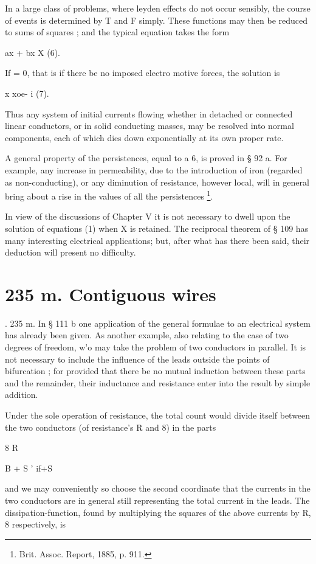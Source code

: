 In a large class of problems, where leyden effects do not occur sensibly, the
course of events is determined by T and F simply.  These functions may then be
reduced to sums of squares ; and the typical equation takes the form

ax + bx X (6).

If = 0, that is if there be no imposed electro motive forces, the solution is

x xoe- i (7).

Thus any system of initial currents flowing whether in detached or connected
linear conductors, or in solid conducting masses, may be resolved into normal
components, each of which dies down exponentially at its own proper rate.

A general property of the persistences, equal to a 6, is proved in § 92 a.
For example, any increase in permeability, due to the introduction of iron
(regarded as non-conducting), or any diminution of resistance, however local,
will in general bring about a rise in the values of all the persistences
\footnote{Brit. Assoc. Report, 1885, p. 911.}.

In view of the discussions of Chapter V it is not necessary to dwell upon the
solution of equations (1) when X is retained. The reciprocal theorem of § 109
has many interesting electrical applications; but, after what has there been
said, their deduction will present no difficulty.

\section{235 m. Contiguous wires}.
235 m. In § 111 b one
application of the general formulae to an electrical system has already been
given. As another example, also relating to the case of two degrees of freedom,
w'o may take the problem of two conductors in parallel. It is not necessary to
include the influence of the leads outside the points of bifurcation ; for
provided that there be no mutual induction between these parts and the
remainder, their inductance and resistance enter into the result by simple
addition.

Under the sole operation of resistance, the total count would divide itself
between the two conductors (of resistance's R and 8) in the parts

8  R

B + S ' if+S

and we may conveniently so choose the second coordinate that the currents in
the two conductors are in general still representing the total current in the
leads. The dissipation-function, found by multiplying the squares of the above
currents by R, 8 respectively, is

